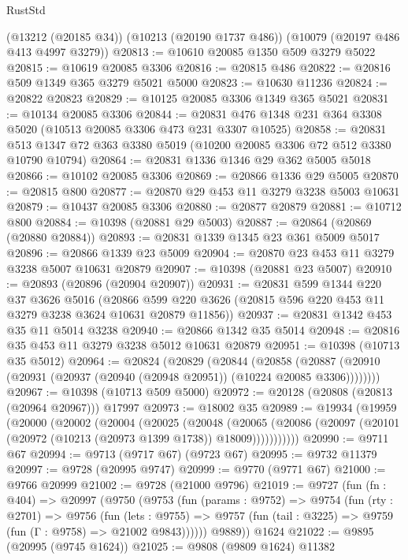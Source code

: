 \begin{lexlean}{RustStd}
\begin{coremodule}
{\begin{coremodule}
{{{{{{{{{{{{{{{{{{{{{{{{{{    (@13212 (@20185 @34))
    (@10213 (@20190 @1737 @486))
    (@10079 (@20197 @486 @413 @4997 @3279))
@20813 := @10610 @20085 @1350 @509 @3279 @5022
@20815 := @10619 @20085 @3306
@20816 := @20815 @486
@20822 := @20816 @509 @1349 @365 @3279 @5021 @5000
@20823 := @10630 @11236
@20824 := @20822 @20823
@20829 := @10125 @20085 @3306 @1349 @365 @5021
@20831 := @10134 @20085 @3306
@20844 := @20831 @476 @1348 @231 @364 @3308 @5020 (@10513 @20085 @3306 @473 @231 @3307 @10525)
@20858 := @20831 @513 @1347 @72 @363 @3380 @5019 (@10200 @20085 @3306 @72 @512 @3380 @10790 @10794)
@20864 := @20831 @1336 @1346 @29 @362 @5005 @5018
@20866 := @10102 @20085 @3306
@20869 := @20866 @1336 @29 @5005
@20870 := @20815 @800
@20877 := @20870 @29 @453 @11 @3279 @3238 @5003 @10631
@20879 := @10437 @20085 @3306
@20880 := @20877 @20879
@20881 := @10712 @800
@20884 := @10398 (@20881 @29 @5003)
@20887 := @20864 (@20869 (@20880 @20884))
@20893 := @20831 @1339 @1345 @23 @361 @5009 @5017
@20896 := @20866 @1339 @23 @5009
@20904 := @20870 @23 @453 @11 @3279 @3238 @5007 @10631 @20879
@20907 := @10398 (@20881 @23 @5007)
@20910 := @20893 (@20896 (@20904 @20907))
@20931 := @20831
    @599
    @1344
    @220
    @37
    @3626
    @5016
    (@20866 @599 @220 @3626 (@20815 @596 @220 @453 @11 @3279 @3238 @3624 @10631 @20879 @11856))
@20937 := @20831 @1342 @453 @35 @11 @5014 @3238
@20940 := @20866 @1342 @35 @5014
@20948 := @20816 @35 @453 @11 @3279 @3238 @5012 @10631 @20879
@20951 := @10398 (@10713 @35 @5012)
@20964 := @20824
    (@20829
      (@20844
        (@20858
          (@20887 (@20910 (@20931 (@20937 (@20940 (@20948 @20951)) (@10224 @20085 @3306))))))))
@20967 := @10398 (@10713 @509 @5000)
@20972 := @20128 (@20808 (@20813 (@20964 @20967))) @17997
@20973 := @18002 @35
@20989 := @19934
    (@19959
      (@20000
        (@20002
          (@20004
            (@20025
              (@20048
                (@20065
                  (@20086 (@20097 (@20101 (@20972 (@10213 (@20973 @1399 @1738)) @18009)))))))))))
@20990 := @9711 @67
@20994 := @9713 (@9717 @67) (@9723 @67)
@20995 := @9732 @11379
@20997 := @9728 (@20995 @9747)
@20999 := @9770 (@9771 @67)
@21000 := @9766 @20999
@21002 := @9728 (@21000 @9796)
@21019 := @9727
    (fun (fn : @404) =>
    @20997
      (@9750
        (@9753
          (fun (params : @9752) =>
          @9754
            (fun (rty : @2701) =>
            @9756
              (fun (lets : @9755) =>
              @9757 (fun (tail : @3225) => @9759 (fun (Γ : @9758) => @21002 @9843))))))
        @9889))
    @1624
@21022 := @9895 (@20995 (@9745 @1624))
@21025 := @9808 (@9809 @1624) @11382
}}}}}}}}}}}}}}}}}}}}}}}}}}
\end{coremodule}}
\end{coremodule}
\end{lexlean}
